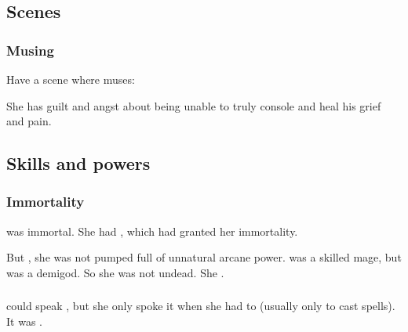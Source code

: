 \subsection{Scenes}
\subsubsection{Musing}
Have a scene where \Criseis{} muses: 

She has guilt and angst about being unable to truly console \Ishnaruchaefir{} and heal his grief and pain. 










\subsection{Skills and powers}





\subsubsection{Immortality}
\Criseis was immortal. 
She had , which had granted her immortality.

But , she was not pumped full of unnatural arcane power. 
\Criseis was a skilled mage, but \Psyrex was a demigod.
So she was not undead. 
She .





\subsubsection{\TrueDraconic}
\Criseis could speak \TrueDraconic, but she only spoke it when she had to (usually only to cast spells).
It was . 















